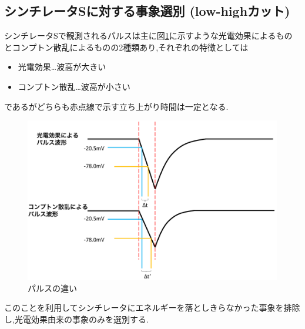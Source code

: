 \subsection{シンチレータSに対する事象選別 (low-highカット)}
シンチレータSで観測されるパルスは主に図\ref{fig:pulse_diff}に示すような光電効果によるものとコンプトン散乱によるものの2種類あり,それぞれの特徴としては
\begin{itemize}
	\item 光電効果…波高が大きい
	\item コンプトン散乱…波高が小さい
\end{itemize}
であるがどちらも赤点線で示す立ち上がり時間は一定となる.
\begin{figure}[H]
	\begin{center}
		\includegraphics[width=15cm]{fig/isb/pulse_difference.pdf}
		\caption{パルスの違い}
		\label{fig:pulse_diff}
	\end{center}
\end{figure}
このことを利用してシンチレータにエネルギーを落としきらなかった事象を排除し,光電効果由来の事象のみを選別する.

